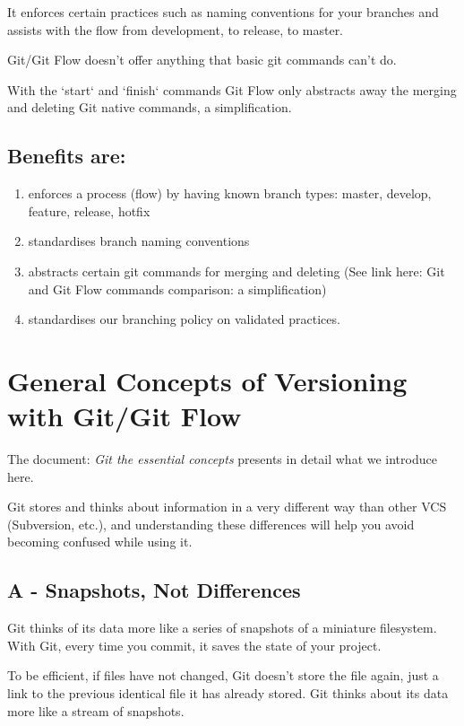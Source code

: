 \documentclass{tufte-handout}
\begin{document}
	It enforces certain practices such as naming conventions for your branches and assists with the flow from development, to release, to master.
	
	Git/Git Flow doesn't offer anything that basic git commands can't do.
	
	With the `start` and `finish` commands Git Flow only abstracts away the merging and deleting Git native commands, a simplification.
	
	\subsection*{Benefits are:}
	\begin{enumerate}
		\item enforces a process (flow) by having known branch types: master, develop, feature, release, hotfix
		\item standardises branch naming conventions
		\item abstracts certain git commands for merging and deleting (See link here: Git and Git Flow commands comparison: a simplification)
		\item standardises our branching policy on validated practices.
	\end{enumerate}
	
	
	
	\section{General Concepts of Versioning with Git/Git Flow}
	
	The document: \emph{Git the essential concepts} presents in detail what we introduce here.
	
	Git stores and thinks about information in a very different way than other VCS (Subversion, etc.), and understanding these differences will help you avoid becoming confused while using it.
	
	\subsection{A - Snapshots, Not Differences}
	
	Git thinks of its data more like a series of snapshots of a miniature filesystem. With Git, every time you commit, it saves the state of your project.
	
	To be efficient, if files have not changed, Git doesn't store the file again, just a link to the previous identical file it has already stored. Git thinks about its data more like a stream of snapshots.
	
\end{document}
